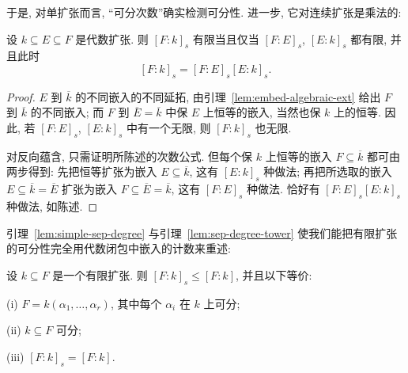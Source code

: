 于是, 对单扩张而言, ``可分次数''确实检测可分性. 进一步, 它对连续扩张是乘法的:

\begin{lemma}\label{lem:sep-degree-tower}
设 $k\subseteq E\subseteq F$ 是代数扩张. 则 $[F:k]_s$ 有限当且仅当 $[F:E]_s$, $[E:k]_s$ 都有限, 并且此时
\[
[F:k]_s=[F:E]_s[E:k]_s.
\]
\end{lemma}

\begin{proof}
$E$ 到 $\overline{k}$ 的不同嵌入的不同延拓, 由引理~\ref{lem:embed-algebraic-ext} 给出 $F$ 到 $\overline{k}$ 的不同嵌入; 而 $F$ 到 $\overline{E}=\overline{k}$ 中保 $E$ 上恒等的嵌入, 当然也保 $k$ 上的恒等. 因此, 若 $[F:E]_s$, $[E:k]_s$ 中有一个无限, 则 $[F:k]_s$ 也无限.

对反向蕴含, 只需证明所陈述的次数公式. 但每个保 $k$ 上恒等的嵌入 $F\subseteq\overline{k}$ 都可由两步得到: 先把恒等扩张为嵌入 $E\subseteq\overline{k}$, 这有 $[E:k]_s$ 种做法; 再把所选取的嵌入 $E\subseteq\overline{k}=\overline{E}$ 扩张为嵌入 $F\subseteq\overline{E}=\overline{k}$, 这有 $[F:E]_s$ 种做法. 恰好有 $[F:E]_s[E:k]_s$ 种做法, 如陈述.
\end{proof}

引理~\ref{lem:simple-sep-degree} 与引理~\ref{lem:sep-degree-tower} 使我们能把有限扩张的可分性完全用代数闭包中嵌入的计数来重述:

\begin{proposition}\label{prop:finite-sep-degree}
设 $k\subseteq F$ 是一个有限扩张. 则 $[F:k]_s\leq[F:k]$, 并且以下等价:

(i) $F=k(\alpha_1,\ldots,\alpha_r)$, 其中每个 $\alpha_i$ 在 $k$ 上可分;

(ii) $k\subseteq F$ 可分;

(iii) $[F:k]_s=[F:k]$.
\end{proposition}

